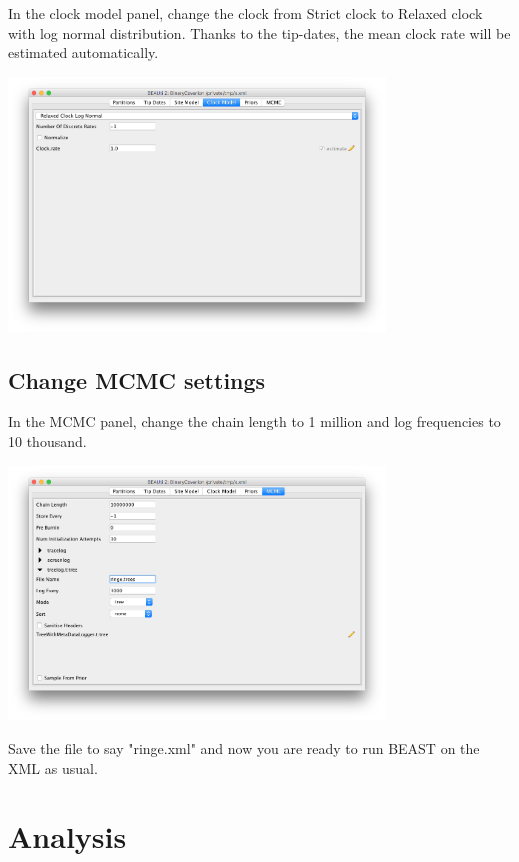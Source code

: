 \documentclass{article}
\begin{document}
In the clock model panel, change the clock from Strict clock to Relaxed clock with log normal distribution.
Thanks to the tip-dates, the mean clock rate will be estimated automatically.

\begin{center}
\includegraphics[width=0.75\textwidth]{clockpanel}
\end{center}

\subsection*{Change MCMC settings}

In the MCMC panel, change the chain length to 1 million and log frequencies to 10 thousand.

\begin{center}
\includegraphics[width=0.75\textwidth]{mcmcpanel}
\end{center}

Save the file to say "ringe.xml" and now you are ready to run BEAST on the XML as usual.

\section*{Analysis}
\end{document}

